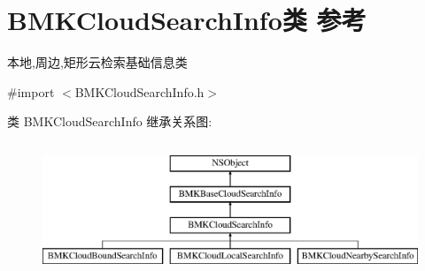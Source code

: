 \hypertarget{interface_b_m_k_cloud_search_info}{\section{B\+M\+K\+Cloud\+Search\+Info类 参考}
\label{interface_b_m_k_cloud_search_info}
}


本地,周边,矩形云检索基础信息类  




{\ttfamily \#import $<$B\+M\+K\+Cloud\+Search\+Info.\+h$>$}

类 B\+M\+K\+Cloud\+Search\+Info 继承关系图\+:\begin{figure}[H]
\begin{center}
\leavevmode
\includegraphics[height=4.000000cm]{interface_b_m_k_cloud_search_info}
\end{center}
\end{figure}
